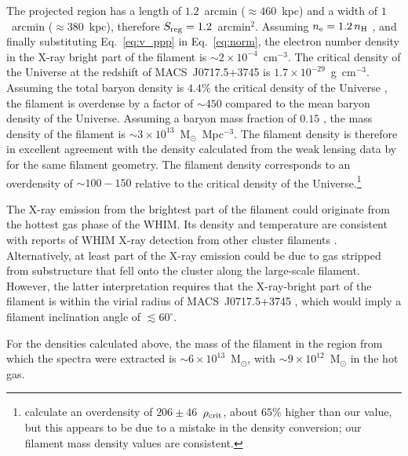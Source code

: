 The projected region has a length of $1.2$~arcmin ($\approx 460$~kpc) and a width of $1$~arcmin ($\approx 380$~kpc), therefore $S_{\rm reg} = 1.2$~arcmin$^{2}$. Assuming $n_{\rm e} = 1.2\, n_{\rm H}$ \citep[e.g.,][]{Bohringer2010}, and finally substituting Eq.~\ref{eq:v_ppp} in Eq.~\ref{eq:norm}, the electron number density in the X-ray bright part of the filament is $\sim 2\times 10^{-4}$~cm$^{-3}$. The critical density of the Universe at the redshift of MACS~J0717.5+3745 is $1.7\times 10^{-29}$~g~cm$^{-3}$. Assuming the total baryon density is $4.4\%$ the critical density of the Universe \citep{Kirkman2003}, the filament is overdense by a factor of $\sim 450$ compared to the mean baryon density of the Universe. Assuming a baryon mass fraction of $0.15$ \citep[e.g.,][]{Mantz2014}, the mass density of the filament is $\sim 3\times 10^{13}$~M$_{\odot}$~Mpc$^{-3}$. The filament density is therefore in excellent agreement with the density calculated from the weak lensing data by \citet{Jauzac2012} for the same filament geometry. The filament density corresponds to an overdensity of $\sim 100-150$ relative to the critical density of the Universe.\footnote{\citet{Jauzac2012} calculate an overdensity of $206\pm 46$~$\rho_{\rm crit}$, about $65\%$ higher than our value, but this appears to be due to a mistake in the density conversion; our filament mass density values are consistent.} 

The X-ray emission from the brightest part of the filament could originate from the hottest gas phase of the WHIM. Its density and temperature are consistent with reports of WHIM X-ray detection from other cluster filaments \citep[e.g.,][]{Werner2008, Eckert2015}. Alternatively, at least part of the X-ray emission could be due to gas stripped from substructure that fell onto the cluster along the large-scale filament. However, the latter interpretation requires that the X-ray-bright part of the filament is within the virial radius of MACS~J0717.5+3745 \citep[$r_{\rm 138} = 2.5$~Mpc;][]{Medezinski2013}, which would imply a filament inclination angle of $\lesssim 60^\circ$. 

For the densities calculated above, the mass of the filament in the region from which the spectra were extracted is $\sim 6\times 10^{13}$~M$_\odot$, with $\sim 9\times 10^{12}$~M$_\odot$ in the hot gas. 

